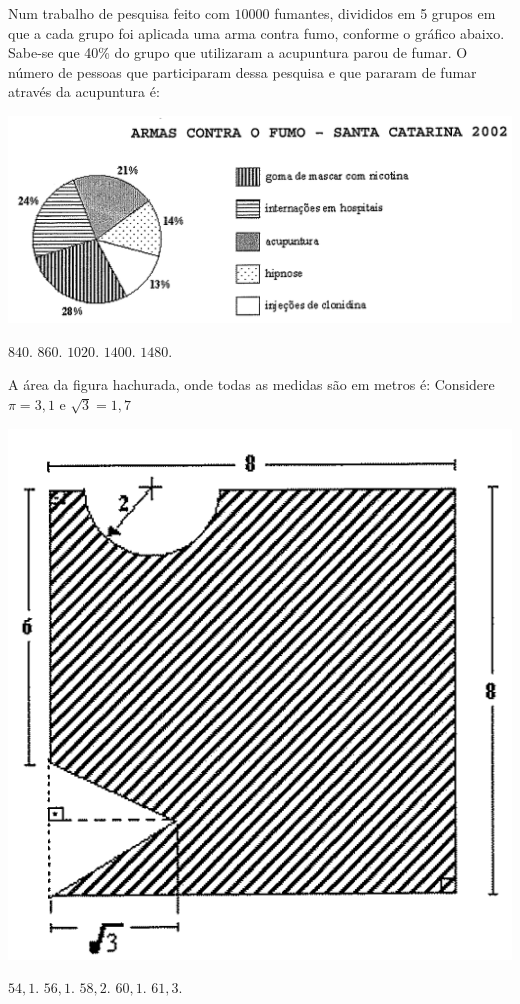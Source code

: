 \begin{question}%
Num trabalho de pesquisa feito com \(10 000\) fumantes, divididos em 5 grupos em que a cada grupo foi aplicada uma arma contra fumo, conforme o gráfico abaixo. Sabe-se que 40\% do grupo que utilizaram a acupuntura parou de fumar. O número de pessoas que participaram dessa pesquisa e que pararam de fumar através da acupuntura é:

    \centering
    \includegraphics[width=.5\textwidth]{CONCURSO/EAM/IMAGES/2004/EAM200404IMG.png}
    \begin{tasks}
        \task \(840\).
        \task \(860\).
        \task \(1020\).
        \task \(1400\).
        \task \(1480\).
    \end{tasks}
\end{question}

\begin{question}%
A área da figura hachurada, onde todas as medidas são em metros é: Considere \(\pi = 3,1\) e \(\sqrt{3} = 1,7\)

    \centering
    \includegraphics[width=.3\textwidth]{CONCURSO/EAM/IMAGES/2004/EAM200405IMG.png}
    \begin{tasks}
        \task \(54,1\).
        \task \(56,1\).
        \task \(58,2\).
        \task \(60,1\).
        \task \(61,3\).
    \end{tasks}
\end{question}

